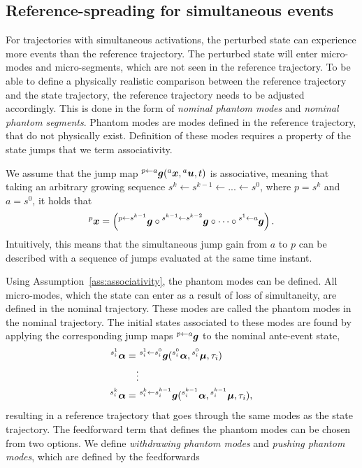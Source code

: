 \documentclass[../DC2017114Bouma.tex]{subfiles}
\begin{document}
\subsection{Reference-spreading for simultaneous events}
For trajectories with simultaneous activations, the perturbed state can experience more events than the reference trajectory. The perturbed state will enter micro-modes and micro-segments, which are not seen in the reference trajectory. To be able to define a physically realistic comparison between the reference trajectory and the state trajectory, the reference trajectory needs to be adjusted accordingly. This is done in the form of \textit{nominal phantom modes} and \textit{nominal phantom segments}. Phantom modes are modes defined in the reference trajectory, that do not physically exist. Definition of these modes requires a property of the state jumps that we term associativity.
\begin{myass}\label{ass:associativity}
We assume that the jump map $\hspace{0cm}^{p\leftarrow a}{\boldsymbol{g}}(\hspace{0cm}^{a}{\boldsymbol{x}},\hspace{0cm}^{a}{\boldsymbol{u}},t)$ is associative, meaning that taking an arbitrary growing sequence $s^k\leftarrow s^{k-1} \leftarrow ... \leftarrow s^0$, where $p = s^k$ and $a = s^0$, it holds that
\begin{align}
\hspace{0cm}^{p}{\boldsymbol{x}} = \left(\hspace{0cm}^{p\leftarrow s^{k-1}}{\boldsymbol{g}} \circ \hspace{0cm}^{s^{k-1} \leftarrow s^{k-2}}{\boldsymbol{g}} \circ \cdots \circ \hspace{0cm}^{s^1 \leftarrow a}{\boldsymbol{g}} \right).
\end{align}
Intuitively, this means that the simultaneous jump gain from $a$ to $p$ can be described with a sequence of jumps evaluated at the same time instant.
\end{myass}
Using Assumption~\ref{ass:associativity}, the phantom modes can be defined. All micro-modes, which the state can enter as a result of loss of simultaneity, are defined in the nominal trajectory. These modes are called the phantom modes in the nominal trajectory. The initial states associated to these modes are found by applying the corresponding jump maps $\hspace{0cm}^{p\leftarrow a}{\boldsymbol{g}}$ to the nominal ante-event state,
\begin{align}
\hspace{0cm}^{s_i^1}\boldsymbol{\alpha} =&\ \hspace{0cm}^{s_i^1\leftarrow s_i^0}{\boldsymbol{g}}(\hspace{0cm}^{s_i^0}\boldsymbol{\alpha},\hspace{0cm}^{s_i^0}\boldsymbol{\mu},\tau_i)\nonumber\\
&\vdots\label{eq:4phantomini}\\
\hspace{0cm}^{s_i^{k}}\boldsymbol{\alpha} =&\ \hspace{0cm}^{s_i^k\leftarrow s_i^{k-1}}{\boldsymbol{g}}(\hspace{0cm}^{s_i^{k-1}}\boldsymbol{\alpha},\hspace{0cm}^{s_i^{k-1}}\boldsymbol{\mu},\tau_i),\nonumber
\end{align}
resulting in a reference trajectory that goes through the same modes as the state trajectory. The feedforward term that defines the phantom modes can be chosen from two options. We define \textit{withdrawing phantom modes} and \textit{pushing phantom modes}, which are defined by the feedforwards
\end{document}

